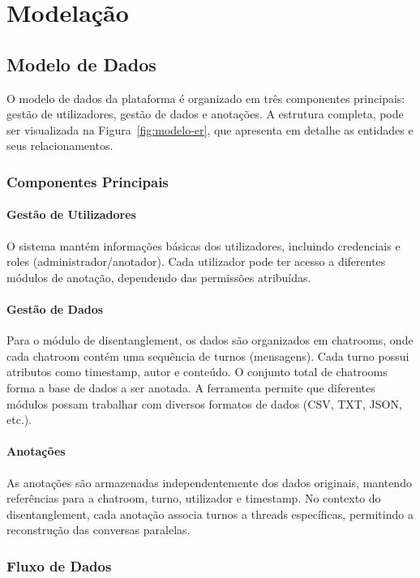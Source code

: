 \section{Modelação}

\subsection{Modelo de Dados}

O modelo de dados da plataforma é organizado em três componentes principais: gestão de utilizadores, gestão de dados e anotações. A estrutura completa, pode ser visualizada na Figura~\ref{fig:modelo-er}, que apresenta em detalhe as entidades e seus relacionamentos.

\subsubsection{Componentes Principais}

\paragraph{Gestão de Utilizadores}
O sistema mantém informações básicas dos utilizadores, incluindo credenciais e roles (administrador/anotador). Cada utilizador pode ter acesso a diferentes módulos de anotação, dependendo das permissões atribuídas.

\paragraph{Gestão de Dados}
Para o módulo de disentanglement, os dados são organizados em chatrooms, onde cada chatroom contém uma sequência de turnos (mensagens). Cada turno possui atributos como timestamp, autor e conteúdo. O conjunto total de chatrooms forma a base de dados a ser anotada. A ferramenta permite que diferentes módulos possam trabalhar com diversos formatos de dados (CSV, TXT, JSON, etc.).

\paragraph{Anotações}
As anotações são armazenadas independentemente dos dados originais, mantendo referências para a chatroom, turno, utilizador e timestamp. No contexto do disentanglement, cada anotação associa turnos a threads específicas, permitindo a reconstrução das conversas paralelas.

\subsubsection{Fluxo de Dados}

